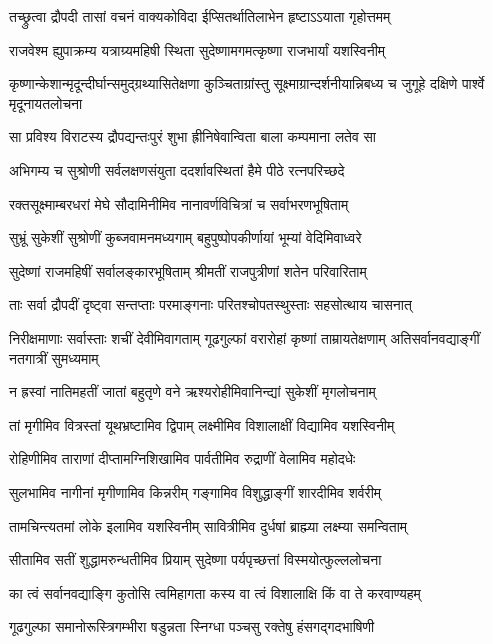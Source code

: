 \twolineshloka
{तच्छ्रुत्वा द्रौपदी तासां वचनं वाक्यकोविदा}
{ईप्सितर्थातिलाभेन हृष्टाऽऽयाता गृहोत्तमम्}


\twolineshloka
{राजवेश्म ह्युपाक्रम्य यत्राग्र्यमहिषी स्थिता}
{सुदेष्णामगमत्कृष्णा राजभार्यां यशस्विनीम्}


\threelineshloka
{कृष्णान्केशान्मृदून्दीर्घान्समुद्ग्रथ्यासितेक्षणा}
{कुञ्चिताग्रांस्तु सूक्ष्माग्रान्दर्शनीयान्निबध्य च}
{जुगूहे दक्षिणे पार्श्वे मृदूनायतलोचना}


\twolineshloka
{सा प्रविश्य विराटस्य द्रौपद्यन्तःपुरं शुभा}
{ह्रीनिषेवान्विता बाला कम्पमाना लतेव सा}


\twolineshloka
{अभिगम्य च सुश्रोणी सर्वलक्षणसंयुता}
{ददर्शावस्थितां हैमे पीठे रत्नपरिच्छदे}


\twolineshloka
{रक्तसूक्ष्माम्बरधरां मेघे सौदामिनीमिव}
{नानावर्णविचित्रां च सर्वाभरणभूषिताम्}


\twolineshloka
{सुभ्रूं सुकेशीं सुश्रोणीं कुब्जवामनमध्यगाम्}
{बहुपुष्पोपकीर्णायां भूम्यां वेदिमिवाध्वरे}


\twolineshloka
{सुदेष्णां राजमहिषीं सर्वालङ्कारभूषिताम्}
{श्रीमतीं राजपुत्रीणां शतेन परिवारिताम्}


\twolineshloka
{ताः सर्वा द्रौपदीं दृष्ट्वा सन्तप्ताः परमाङ्गनाः}
{परितश्चोपतस्थुस्ताः सहसोत्थाय चासनात्}


\threelineshloka
{निरीक्षमाणाः सर्वास्ताः शचीं देवीमिवागताम्}
{गूढगुल्फां वरारोहां कृष्णां ताम्रायतेक्षणाम्}
{अतिसर्वानवद्याङ्गीं नतगात्रीं सुमध्यमाम्}


\twolineshloka
{न ह्रस्वां नातिमहतीं जातां बहुतृणे वने}
{ऋश्यरोहीमिवानिन्द्यां सुकेशीं मृगलोचनाम्}


\twolineshloka
{तां मृगीमिव वित्रस्तां यूथभ्रष्टामिव द्विपाम्}
{लक्ष्मीमिव विशालाक्षीं विद्यामिव यशस्विनीम्}


\twolineshloka
{रोहिणीमिव ताराणां दीप्तामग्निशिखामिव}
{पार्वतीमिव रुद्राणीं वेलामिव महोदधेः}


\twolineshloka
{सुलभामिव नागीनां मृगीणामिव किन्नरीम्}
{गङ्गामिव विशुद्धाङ्गीं शारदीमिव शर्वरीम्}


\twolineshloka
{तामचिन्त्यतमां लोके इलामिव यशस्विनीम्}
{सावित्रीमिव दुर्धषां ब्राह्म्या लक्ष्म्या समन्विताम्}


\twolineshloka
{सीतामिव सतीं शुद्धामरुन्धतीमिव प्रियाम्}
{सुदेष्णा पर्यपृच्छत्तां विस्मयोत्फुल्ललोचना}


\twolineshloka
{का त्वं सर्वानवद्याङ्गि कुतोसि त्वमिहागता}
{कस्य वा त्वं विशालाक्षि किं वा ते करवाण्यहम्}


\twolineshloka
{गूढगुल्फा समानोरूस्त्रिगम्भीरा षडुन्नता}
{स्निग्धा पञ्चसु रक्तेषु हंसगद्गदभाषिणी}


